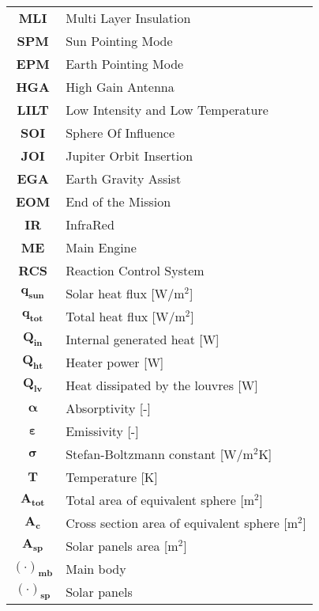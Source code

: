 \begin{multicols}{2}
{\begin{xltabular}{\linewidth}{c>{\raggedright\arraybackslash}X}
		\textbf{MLI} & Multi Layer Insulation \\
		\textbf{SPM} & Sun Pointing Mode \\
		\textbf{EPM} & Earth Pointing Mode \\
		\textbf{HGA} & High Gain Antenna \\
		\textbf{LILT} & Low Intensity and Low Temperature \\
		\textbf{SOI} & Sphere Of Influence \\
		\textbf{JOI} & Jupiter Orbit Insertion \\
		\textbf{EGA} & Earth Gravity Assist \\
		\textbf{EOM} & End of the Mission \\
		\textbf{IR} & InfraRed \\
		\textbf{ME} & Main Engine \\
		\textbf{RCS} & Reaction Control System \\
		$\boldsymbol{q_{sun}}$ & Solar heat flux [W/$\textrm{m}^2$] \\
		$\boldsymbol{q_{tot}}$ & Total heat flux [W/$\textrm{m}^2$] \\
		$\boldsymbol{Q_{in}}$ & Internal generated heat [W]\\
		$\boldsymbol{Q_{ht}}$ & Heater power [W] \\
		$\boldsymbol{Q_{lv}}$ & Heat dissipated by the louvres [W] \\
		$\boldsymbol{\alpha}$ & Absorptivity [-] \\
		$\boldsymbol{\varepsilon}$ & Emissivity [-] \\
		$\boldsymbol{\sigma}$ & Stefan-Boltzmann constant [W/$\textrm{m}^2$K] \\
		$\boldsymbol{T}$ & Temperature [K] \\
		$\boldsymbol{A_{tot}}$ & Total area of equivalent sphere [$\textrm{m}^2$] \\
		$\boldsymbol{A_c}$ & Cross section area of equivalent sphere [$\textrm{m}^2$] \\
		$\boldsymbol{A_{sp}}$ & Solar panels area [$\textrm{m}^2$] \\
		$\boldsymbol{(\cdot)_{mb}}$ & Main body \\
		$\boldsymbol{(\cdot)_{sp}}$ & Solar panels
 	\end{xltabular}
	\unskip
	\unpenalty
	\unpenalty}
	\unvbox\ltmcbox
\end{multicols}